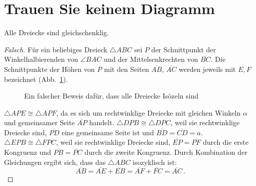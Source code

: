 \section{Trauen Sie keinem Diagramm}\label{s.collapse-isoceles}

\begin{theorem}
Alle Dreiecke sind gleichschenklig.
\end{theorem}

\begin{proof}[Falsch]
Für ein beliebiges Dreieck $\triangle ABC$ sei $P$ der Schnittpunkt der Winkelhalbierenden von $\angle BAC$ und der Mittelsenkrechten von $\overline{BC}$. Die Schnittpunkte der Höhen von $P$ mit den Seiten $\overline{AB}$, $\overline{AC}$ werden jeweils mit $E,F$ bezeichnet (Abb.~\ref{f.collapse-isoceles-1}). 
\begin{figure}[t]
\begin{center}
\end{center}
\caption{Ein falscher Beweis dafür, dass alle Dreiecke Isözeln sind}\label{f.collapse-isoceles-1}
\end{figure}
$\triangle APE\cong \triangle APF$, da es sich um rechtwinklige Dreiecke mit gleichen Winkeln $\alpha$ und gemeinsamer Seite $\overline{AP}$ handelt. $\triangle DPB\cong \triangle DPC$, weil sie rechtwinklige Dreiecke sind, $\overline{PD}$ eine gemeinsame Seite ist und $\overline{BD}=\overline{CD}=a$. $\triangle EPB\cong \triangle FPC$, weil sie rechtwinklige Dreiecke sind, $\overline{EP}=\overline{PF}$ durch die erste Kongruenz und $\overline{PB}=\overline{PC}$ durch die zweite Kongruenz. Durch Kombination der Gleichungen ergibt sich, dass das $\triangle ABC$ isozyklisch ist:
\[
\overline{AB}= \overline{AE}+\overline{EB}=\overline{AF}+\overline{FC} =\overline{AC}\,.
\]
\end{proof}

